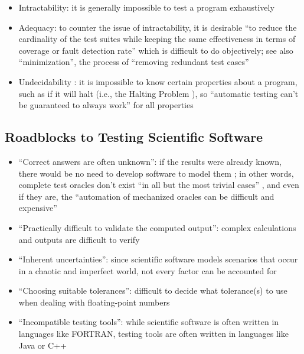 \begin{itemize}
      \item Intractability: it is generally impossible to test a program
            exhaustively \exhInfCite{}
      \item Adequacy: to counter the issue of intractability, it is desirable
            ``to reduce the cardinality of the test suites while keeping the
            same effectiveness in terms of coverage or fault detection rate''
            \citep[p.~5-4]{SWEBOK2024} which is difficult to do objectively;
            see also ``minimization'', the process of ``removing redundant test
            cases'' \citep[p.~5-4]{SWEBOK2024}
      \item Undecidability \citep[p.~439]{PetersAndPedrycz2000}: it is
            impossible to know certain properties about a program, such as if
            it will halt (i.e., the Halting Problem
            \citep[p.~4]{gurfinkel_testing_2017}), so ``automatic testing
            can't be guaranteed to always work'' for all properties
            \citep{nelson_formal_1999} 
\end{itemize}

\subsection[Roadblocks to Testing Scientific Software]
{Roadblocks to Testing Scientific Software
      \citep[p.~67]{KanewalaAndYuehChen2019}}
\label{chap:testing:sec:sci-testing-roadblocks}
\begin{itemize}
      \item ``Correct answers are often unknown'': if the results were already
            known, there would be no need to develop software to model them
            \citep[p.~67]{KanewalaAndYuehChen2019}; in other words, complete
            test oracles don't exist ``in all but the most trivial cases''
            \citep[p.~510]{BarrEtAl2015}, and even if they are, the
            ``automation of mechanized oracles can be difficult and expensive''
            \citep[p.~5.5]{SWEBOK2024}
      \item ``Practically difficult to validate the computed output'': complex
            calculations and outputs are difficult to verify
            \citep[p.~67]{KanewalaAndYuehChen2019}
      \item ``Inherent uncertainties'': since scientific software models
            scenarios that occur in a chaotic and imperfect world, not every
            factor can be accounted for \citep[p.~67]{KanewalaAndYuehChen2019}
      \item ``Choosing suitable tolerances'': difficult to decide what
            tolerance(s) to use when dealing with floating-point numbers
            \citep[p.~67]{KanewalaAndYuehChen2019}
      \item ``Incompatible testing tools'': while scientific software is often
            written in languages like FORTRAN, testing tools are often written
            in languages like Java or C++ \citep[p.~67]{KanewalaAndYuehChen2019}
\end{itemize}

